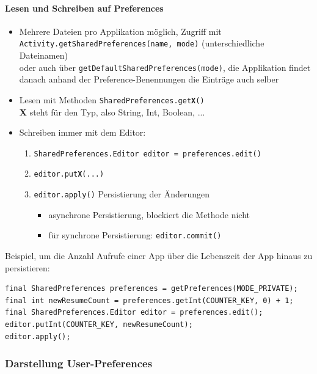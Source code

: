 \documentclass[a4paper]{article}
\begin{document}
\paragraph{Lesen und Schreiben auf Preferences}
\begin{itemize}
	\item Mehrere Dateien pro Applikation möglich, Zugriff mit\\
		\texttt{Activity.getSharedPreferences(name, mode)} (unterschiedliche Dateinamen)\\
		oder auch über \texttt{getDefaultSharedPreferences(mode)}, die Applikation findet danach anhand der Preference-Benennungen die Einträge auch selber
	\item Lesen mit Methoden \texttt{SharedPreferences.get\textbf{X}()}\\
		\textbf{X} steht für den Typ, also String, Int, Boolean, ...
	\item Schreiben immer mit dem Editor:
		\begin{enumerate}
			\item \texttt{SharedPreferences.Editor editor = preferences.edit()}
			\item \texttt{editor.put\textbf{X}(...)}
			\item \texttt{editor.apply()} Persistierung der Änderungen
				\begin{itemize}
					\item asynchrone Persistierung, blockiert die Methode nicht
					\item für synchrone Persistierung: \texttt{editor.commit()}
				\end{itemize}
		\end{enumerate}
\end{itemize}
\vspace{1em}
Beispiel, um die Anzahl Aufrufe einer App über die Lebenszeit der App hinaus zu persistieren:

\begin{lstlisting}
final SharedPreferences preferences = getPreferences(MODE_PRIVATE);
final int newResumeCount = preferences.getInt(COUNTER_KEY, 0) + 1;
final SharedPreferences.Editor editor = preferences.edit();
editor.putInt(COUNTER_KEY, newResumeCount);
editor.apply();
\end{lstlisting}

\subsubsection{Darstellung User-Preferences}
\end{document}
